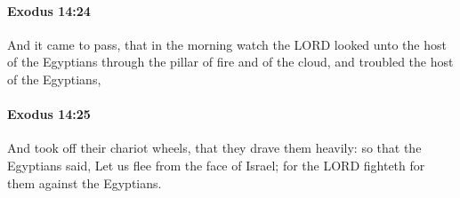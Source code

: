 		\paragraph{Exodus 14:24} %
			\label{EXODUS-14-24}

			And it came to pass, that in the morning watch the LORD looked unto the host of the Egyptians through the pillar of fire and of the cloud, and troubled the host of the Egyptians,


		\paragraph{Exodus 14:25} %
			\label{EXODUS-14-25}

			And took off their chariot wheels, that they drave them heavily: so that the Egyptians said, Let us flee from the face of Israel; for the LORD fighteth for them against the Egyptians.


